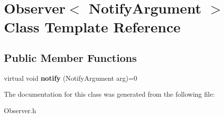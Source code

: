 \hypertarget{classObserver}{\section{Observer$<$ Notify\-Argument $>$ Class Template Reference}
\label{classObserver}
}
\subsection*{Public Member Functions}
\begin{DoxyCompactItemize}
\item 
\hypertarget{classObserver_ad6a783895b06113b2be6f2dbbeb6bdf4}{virtual void {\bfseries notify} (Notify\-Argument arg)=0}\label{classObserver_ad6a783895b06113b2be6f2dbbeb6bdf4}

\end{DoxyCompactItemize}


The documentation for this class was generated from the following file\-:\begin{DoxyCompactItemize}
\item 
Observer.\-h\end{DoxyCompactItemize}
